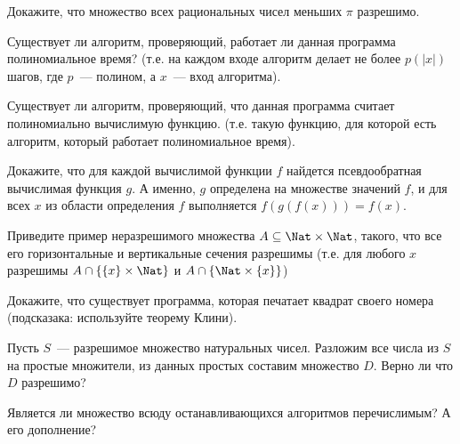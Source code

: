 \setcounter{curtask}{9}


\begin{task}
    Докажите, что множество всех рациональных чисел меньших $\pi$ разрешимо.
\end{task}

\begin{task}
    Существует ли алгоритм, проверяющий, работает ли данная программа
    полиномиальное время? (т.е. на каждом входе алгоритм делает не более $p(|x|)$
    шагов, где $p$~--- полином, а $x$~--- вход алгоритма).
\end{task}

\begin{task}
    Существует ли алгоритм, проверяющий, что данная программа считает полиномиально
    вычислимую функцию. (т.е. такую функцию, для которой есть алгоритм, который
    работает полиномиальное время).
\end{task}

\begin{task}
    Докажите, что для каждой вычислимой функции $f$ найдется
    псевдообратная вычислимая функция $g$. А именно, $g$ определена на
    множестве значений $f$, и для всех $x$ из области определения $f$
    выполняется $f(g(f(x))) = f(x)$.
\end{task}

\begin{task}
    Приведите пример неразрешимого множества $A \subseteq \Nat \times \Nat$,
    такого, что все его горизонтальные и вертикальные сечения
    разрешимы (т.е. для любого $x$ разрешимы $A \cap \{\{x\} \times \Nat\}$
    и $A \cap \{\Nat \times \{x\}\}$)
\end{task}


\begin{task}
    Докажите, что существует программа, которая печатает квадрат
    своего номера (подсказака: используйте теорему Клини).
\end{task}

\begin{task}
    Пусть $S$~--- разрешимое множество натуральных чисел. Разложим все
    числа из $S$ на простые множители, из данных простых составим
    множество $D$. Верно ли что $D$ разрешимо?
\end{task}



\breakline


\begin{task}
    Является ли множество всюду останавливающихся алгоритмов перечислимым? А его
    дополнение?
\end{task}

